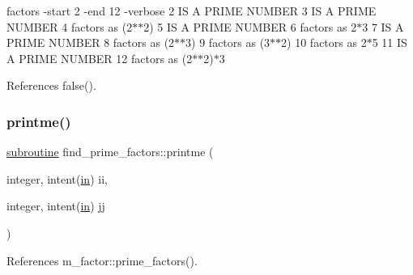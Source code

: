 factors -\/start 2 -\/end 12 -\/verbose 2 IS A P\+R\+I\+ME N\+U\+M\+B\+ER 3 IS A P\+R\+I\+ME N\+U\+M\+B\+ER 4 factors as (2$\ast$$\ast$2) 5 IS A P\+R\+I\+ME N\+U\+M\+B\+ER 6 factors as 2$\ast$3 7 IS A P\+R\+I\+ME N\+U\+M\+B\+ER 8 factors as (2$\ast$$\ast$3) 9 factors as (3$\ast$$\ast$2) 10 factors as 2$\ast$5 11 IS A P\+R\+I\+ME N\+U\+M\+B\+ER 12 factors as (2$\ast$$\ast$2)$\ast$3 

References false().

\mbox{\label{factors_8f90_a96d1688b4d46c7b9dfe3e34cf97426a6}} 
\subsubsection{\texorpdfstring{printme()}{printme()}}
{\footnotesize\ttfamily \hyperlink{M__stopwatch_83_8txt_acfbcff50169d691ff02d4a123ed70482}{subroutine} find\+\_\+prime\+\_\+factors\+::printme (\begin{DoxyParamCaption}\item[{integer, intent(\hyperlink{M__journal_83_8txt_afce72651d1eed785a2132bee863b2f38}{in})}]{ii,  }\item[{integer, intent(\hyperlink{M__journal_83_8txt_afce72651d1eed785a2132bee863b2f38}{in})}]{jj }\end{DoxyParamCaption})}



References m\+\_\+factor\+::prime\+\_\+factors().

